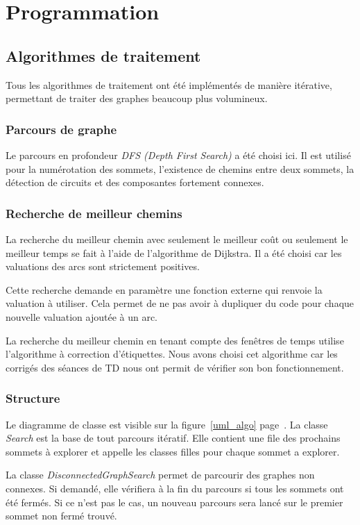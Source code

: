 \documentclass{scrreprt}
\begin{document}
	\chapter{Programmation}
	\section{Algorithmes de traitement}
	Tous les algorithmes de traitement ont été implémentés de manière itérative, permettant de traiter des graphes beaucoup plus volumineux.
	
	\subsection{Parcours de graphe}
	Le parcours en profondeur \textit{DFS (Depth First Search)} a été choisi ici. Il est utilisé pour la numérotation des sommets, l'existence de chemins entre deux sommets, la détection de circuits et des composantes fortement connexes.
	
	\subsection{Recherche de meilleur chemins}
	La recherche du meilleur chemin avec seulement le meilleur coût ou seulement le meilleur temps se fait à l'aide de l'algorithme de Dijkstra. 
	Il a été choisi car les valuations des arcs sont strictement positives.
	
	Cette recherche demande en paramètre une fonction externe qui renvoie la valuation à utiliser. 
	Cela permet de ne pas avoir à dupliquer du code pour chaque nouvelle valuation ajoutée à un arc.
	
	La recherche du meilleur chemin en tenant compte des fenêtres de temps utilise l'algorithme à correction d'étiquettes.
	Nous avons choisi cet algorithme car les corrigés des séances de TD nous ont permit de vérifier son bon fonctionnement.
	
	\subsection{Structure}
	Le diagramme de classe est visible sur la figure~\ref{uml_algo} page~\pageref{uml_algo}.
	La classe \textit{Search} est la base de tout parcours itératif. Elle contient une file des prochains sommets à explorer et appelle les classes filles pour chaque sommet a explorer.
	
	La classe \textit{DisconnectedGraphSearch} permet de parcourir des graphes non connexes. Si demandé, elle vérifiera à la fin du parcours si tous les sommets ont été fermés. Si ce n'est pas le cas, un nouveau parcours sera lancé sur le premier sommet non fermé trouvé.
	
\end{document}
